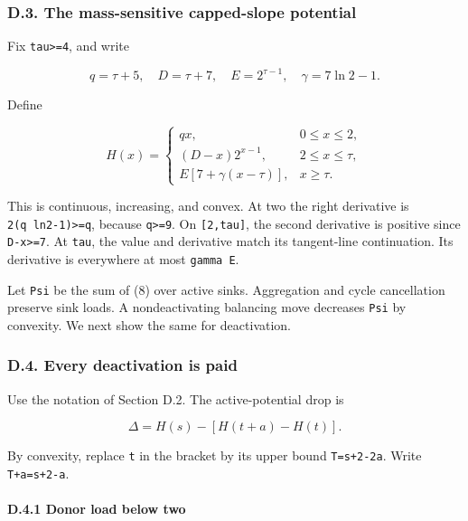 \hypertarget{af-385fd70686-d.3.-the-mass-sensitive-capped-slope-potential}{%
\subsubsection{D.3. The mass-sensitive capped-slope potential}\label{af-385fd70686-d.3.-the-mass-sensitive-capped-slope-potential}}

Fix \texttt{tau\textgreater{}=4}, and write

\[
q=\tau+5,\quad D=\tau+7,\quad E=2^{\tau-1},\quad\gamma=7\ln2-1.
\]

Define

\[
H(x)=\begin{cases}
qx,&0\le x\le2,\\
(D-x)2^{x-1},&2\le x\le\tau,\\
E[7+\gamma(x-\tau)],&x\ge\tau.
\end{cases}                                     \tag{8}
\]

This is continuous, increasing, and convex. At two the right derivative is \texttt{2(q\ ln2-1)\textgreater{}=q}, because \texttt{q\textgreater{}=9}. On \texttt{{[}2,tau{]}}, the second derivative is positive since \texttt{D-x\textgreater{}=7}. At \texttt{tau}, the value and derivative match its tangent-line continuation. Its derivative is everywhere at most \texttt{gamma\ E}.

Let \texttt{Psi} be the sum of (8) over active sinks. Aggregation and cycle cancellation preserve sink loads. A nondeactivating balancing move decreases \texttt{Psi} by convexity. We next show the same for deactivation.

\hypertarget{af-385fd70686-d.4.-every-deactivation-is-paid}{%
\subsubsection{D.4. Every deactivation is paid}\label{af-385fd70686-d.4.-every-deactivation-is-paid}}

Use the notation of Section D.2. The active-potential drop is

\[
\Delta=H(s)-[H(t+a)-H(t)].                        \tag{9}
\]

By convexity, replace \texttt{t} in the bracket by its upper bound \texttt{T=s+2-2a}. Write \texttt{T+a=s+2-a}.

\hypertarget{af-385fd70686-d.4.1-donor-load-below-two}{%
\paragraph{D.4.1 Donor load below two}\label{af-385fd70686-d.4.1-donor-load-below-two}}

